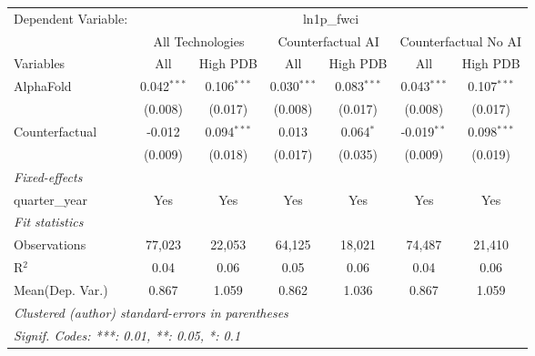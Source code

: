 \begingroup
\centering
\begin{tabular}{lcccccc}
   \tabularnewline \midrule \midrule
   Dependent Variable: & \multicolumn{6}{c}{ln1p\_fwci}\\
 & \multicolumn{2}{c}{All Technologies} & \multicolumn{2}{c}{Counterfactual AI} & \multicolumn{2}{c}{Counterfactual No AI} \\
\cmidrule(lr){1-1}\cmidrule(lr){2-3} \cmidrule(lr){4-5} \cmidrule(lr){6-7}
Variables & \multicolumn{1}{c}{All} & \multicolumn{1}{c}{High PDB} & \multicolumn{1}{c}{All} & \multicolumn{1}{c}{High PDB} & \multicolumn{1}{c}{All} & \multicolumn{1}{c}{High PDB} \\
\cmidrule(lr){1-1}\cmidrule(lr){2-2} \cmidrule(lr){3-3} \cmidrule(lr){4-4} \cmidrule(lr){5-5} \cmidrule(lr){6-6} \cmidrule(lr){7-7}
   AlphaFold      & 0.042$^{***}$ & 0.106$^{***}$ & 0.030$^{***}$ & 0.083$^{***}$ & 0.043$^{***}$ & 0.107$^{***}$\\   
                  & (0.008)       & (0.017)       & (0.008)       & (0.017)       & (0.008)       & (0.017)\\   
   Counterfactual & -0.012        & 0.094$^{***}$ & 0.013         & 0.064$^{*}$   & -0.019$^{**}$ & 0.098$^{***}$\\   
                  & (0.009)       & (0.018)       & (0.017)       & (0.035)       & (0.009)       & (0.019)\\   
   \midrule
   \emph{Fixed-effects}\\
   quarter\_year  & Yes           & Yes           & Yes           & Yes           & Yes           & Yes\\  
   \midrule
   \emph{Fit statistics}\\
   Observations   & 77,023        & 22,053        & 64,125        & 18,021        & 74,487        & 21,410\\  
   R$^2$          & 0.04          & 0.06          & 0.05          & 0.06          & 0.04          & 0.06\\  
Mean(Dep. Var.) & 0.867 & 1.059 & 0.862 & 1.036 & 0.867 & 1.059 \\
   \midrule \midrule
   \multicolumn{7}{l}{\emph{Clustered (author) standard-errors in parentheses}}\\
   \multicolumn{7}{l}{\emph{Signif. Codes: ***: 0.01, **: 0.05, *: 0.1}}\\
\end{tabular}
\par\endgroup

